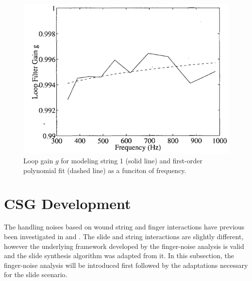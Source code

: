 \documentclass[main.tex]{subfiles}
\begin{document}
\begin{figure}[h]
    \centering
    \includegraphics[scale=.75]{./images/plots/Figure18Orig.png}
    \caption{Loop gain $g$ for modeling string 1 (solid line) and first-order polynomial fit (dashed line) as a funciton of frequency. }
    \label{fig:originalLoopGain}
\end{figure}

\section{CSG Development} \label{sec:CSG_dev}
The handling noises based on wound string and finger interactions have previous been investigated in  and . The slide and string interactions are slightly different, however the underlying framework developed by the finger-noise analysis is valid and the slide synthesis algorithm was adapted from it. In this subsection, the finger-noise analysis will be introduced first followed by the adaptations necessary for the slide scenario.
\end{document}
